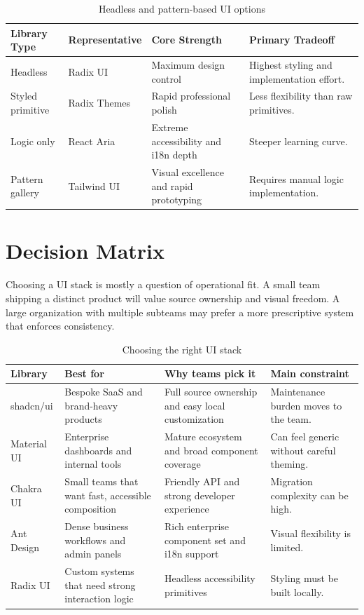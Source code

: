 \documentclass[11pt,twoside,a4paper]{article}
\begin{document}
\begin{table}[htbp]
  \centering
  \caption{Headless and pattern-based UI options}
  \begin{tabularx}{\textwidth}{@{}p{}p{}p{}Y@{}}
    \toprule
    \textbf{Library Type} & \textbf{Representative} & \textbf{Core Strength} & \textbf{Primary Tradeoff} \\
    \midrule
    Headless & Radix UI & Maximum design control & Highest styling and implementation effort. \\
    Styled primitive & Radix Themes & Rapid professional polish & Less flexibility than raw primitives. \\
    Logic only & React Aria & Extreme accessibility and i18n depth & Steeper learning curve. \\
    Pattern gallery & Tailwind UI & Visual excellence and rapid prototyping & Requires manual logic implementation. \\
    \bottomrule
  \end{tabularx}
\end{table}

\section{Decision Matrix}
Choosing a UI stack is mostly a question of operational fit. A small team shipping a distinct product will value source ownership and visual freedom. A large organization with multiple subteams may prefer a more prescriptive system that enforces consistency.

\begin{table}[htbp]
  \centering
  \caption{Choosing the right UI stack}
  \begin{tabularx}{\textwidth}{@{}p{}p{}p{}Y@{}}
    \toprule
    \textbf{Library} & \textbf{Best for} & \textbf{Why teams pick it} & \textbf{Main constraint} \\
    \midrule
    shadcn/ui & Bespoke SaaS and brand-heavy products & Full source ownership and easy local customization & Maintenance burden moves to the team. \\
    Material UI & Enterprise dashboards and internal tools & Mature ecosystem and broad component coverage & Can feel generic without careful theming. \\
    Chakra UI & Small teams that want fast, accessible composition & Friendly API and strong developer experience & Migration complexity can be high. \\
    Ant Design & Dense business workflows and admin panels & Rich enterprise component set and i18n support & Visual flexibility is limited. \\
    Radix UI & Custom systems that need strong interaction logic & Headless accessibility primitives & Styling must be built locally. \\
    \bottomrule
  \end{tabularx}
\end{table}
\end{document}
